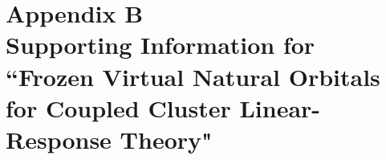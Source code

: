 \documentclass[12pt]{report}
\begin{document}
\chapter*{Appendix B \\ Supporting Information for ``Frozen Virtual Natural Orbitals for
Coupled Cluster Linear-Response Theory"}


%

\end{document}
